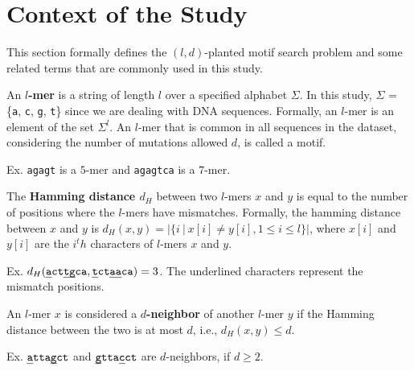 \section{Context of the Study}

This section formally defines the $(l, d)$-planted motif search problem and some related terms that are commonly used in this study. \newline

 \newline
\noindent An \textbf{\boldmath $l$-mer} is a string of length $l$ over a specified alphabet $\Sigma$. In this study, $\Sigma$ = \{\texttt{a}, \texttt{c}, \texttt{g}, \texttt{t}\} since we are dealing with DNA sequences. Formally, an $l$-mer is an element of the set $\Sigma^l$. An $l$-mer that is common in all sequences in the dataset, considering the number of mutations allowed $d$, is called a motif.

\noindent \hspace*{35pt} Ex. \texttt{agagt} is a $5$-mer and \texttt{agagtca} is a $7$-mer.  \newline\newline

 \newline
\noindent The \textbf{\boldmath Hamming distance $d_H$} between two $l$-mers $x$ and $y$ is equal to the number of positions where the $l$-mers have mismatches. Formally, the hamming distance between $x$ and $y$ is $d_H(x, y) = | \{i\ |\ x[i] \neq y[i], 1 \leq i \leq l\} |$, where $x[i]$ and $y[i]$ are the $i^th$ characters of $l$-mers $x$ and $y$.

\noindent \hspace*{35pt} Ex. $d_H(\texttt{\uline{a}ct\uline{tg}ca}, \texttt{\uline{t}ct\uline{aa}ca}) = 3$.\newline
\noindent \hspace*{55pt} The underlined characters represent the mismatch positions. \newline

 \newline
\noindent An $l$-mer $x$ is considered a \textbf{\boldmath $d$-neighbor} of another $l$-mer $y$ if the Hamming distance between the two is at most $d$, i.e., $d_H(x, y) \leq d$.

\noindent \hspace*{35pt} Ex. $\texttt{\uline{a}tta\uline{g}ct}$ and $\texttt{\uline{g}tta\uline{c}ct}$ are $d$-neighbors, \newline
\noindent \hspace*{55pt} if $d \geq 2$. \newline

